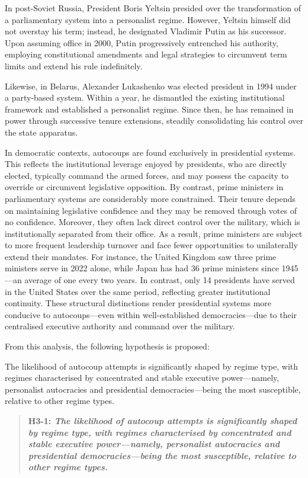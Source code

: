 \documentclass[
  12pt,
]{report}
\begin{document}
In post-Soviet Russia, President Boris Yeltsin presided over the
transformation of a parliamentary system into a personalist regime.
However, Yeltsin himself did not overstay his term; instead, he
designated Vladimir Putin as his successor. Upon assuming office in
2000, Putin progressively entrenched his authority, employing
constitutional amendments and legal strategies to circumvent term limits
and extend his rule indefinitely.

Likewise, in Belarus, Alexander Lukashenko was elected president in 1994
under a party-based system. Within a year, he dismantled the existing
institutional framework and established a personalist regime. Since
then, he has remained in power through successive tenure extensions,
steadily consolidating his control over the state apparatus.

In democratic contexts, autocoups are found exclusively in presidential
systems. This reflects the institutional leverage enjoyed by presidents,
who are directly elected, typically command the armed forces, and may
possess the capacity to override or circumvent legislative opposition.
By contrast, prime ministers in parliamentary systems are considerably
more constrained. Their tenure depends on maintaining legislative
confidence and they may be removed through votes of no confidence.
Moreover, they often lack direct control over the military, which is
institutionally separated from their office. As a result, prime
ministers are subject to more frequent leadership turnover and face
fewer opportunities to unilaterally extend their mandates. For instance,
the United Kingdom saw three prime ministers serve in 2022 alone, while
Japan has had 36 prime ministers since 1945---an average of one every
two years. In contrast, only 14 presidents have served in the United
States over the same period, reflecting greater institutional
continuity. These structural distinctions render presidential systems
more conducive to autocoups---even within well-established
democracies---due to their centralised executive authority and command
over the military.

From this analysis, the following hypothesis is proposed:

The likelihood of autocoup attempts is significantly shaped by regime
type, with regimes characterised by concentrated and stable executive
power---namely, personalist autocracies and presidential
democracies---being the most susceptible, relative to other regime
types.

\begin{quote}
\textbf{H3-1: \emph{The likelihood of autocoup attempts is significantly
shaped by regime type, with regimes characterised by concentrated and
stable executive power---namely, personalist autocracies and
presidential democracies---being the most susceptible, relative to other
regime types.}}
\end{quote}
\end{document}
